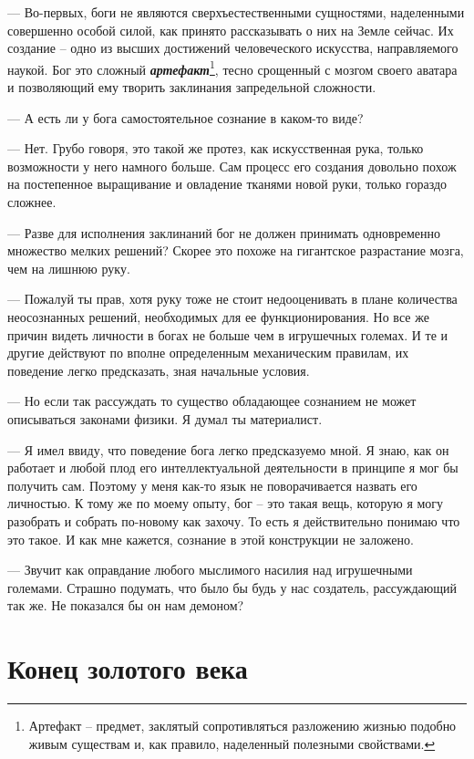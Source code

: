 \documentclass[12pt,a4paper]{article}
\begin{document}
--- Во-первых, боги не являются сверхъестественными сущностями, наделенными совершенно особой силой, как принято рассказывать о них на Земле сейчас. Их создание -- одно из высших достижений человеческого искусства, направляемого наукой. Бог это сложный \textbf{\textit{артефакт}}\footnote{Артефакт --  предмет, заклятый сопротивляться разложению жизнью подобно живым существам и, как правило, наделенный полезными свойствами.}, тесно срощенный с мозгом своего аватара и позволяющий ему творить заклинания запредельной сложности.

--- А есть ли у бога самостоятельное сознание в каком-то виде?

--- Нет. Грубо говоря, это такой же протез, как искусственная рука, только возможности у него намного больше. Сам процесс его создания довольно похож на постепенное выращивание и овладение тканями новой руки, только гораздо сложнее.

--- Разве для исполнения заклинаний бог не должен принимать одновременно множество мелких решений? Скорее это похоже на гигантское разрастание мозга, чем на лишнюю руку.

--- Пожалуй ты прав, хотя руку тоже не стоит недооценивать в плане количества неосознанных решений, необходимых для ее функционирования. Но все же причин видеть личности в богах не больше чем в игрушечных големах. И те и другие действуют по вполне определенным механическим правилам, их поведение легко предсказать, зная начальные условия.

--- Но если так рассуждать то существо обладающее сознанием не может описываться законами физики. Я думал ты материалист.

--- Я имел ввиду, что поведение бога легко предсказуемо мной. Я знаю, как он работает и любой плод его интеллектуальной деятельности в принципе я мог бы получить сам. Поэтому у меня как-то язык не поворачивается назвать его личностью. К тому же по моему опыту, бог -- это такая вещь, которую я могу разобрать и собрать по-новому как захочу. То есть я действительно понимаю что это такое. И как мне кажется, сознание в этой конструкции не заложено.

--- Звучит как оправдание любого мыслимого насилия над игрушечными големами. Страшно подумать, что было бы будь у нас создатель, рассуждающий так же. Не показался бы он нам демоном?

\section*{Конец золотого века}
\end{document}

